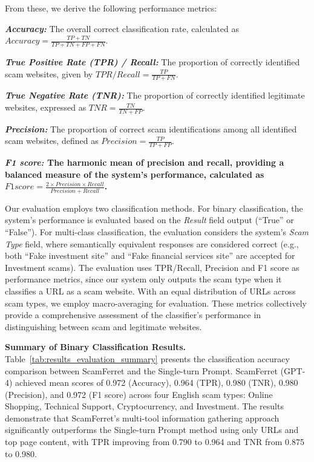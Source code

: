 \documentclass[runningheads]{llncs}
\begin{document}
From these, we derive the following performance metrics:

\noindent\textbf{\textit{Accuracy:}}
The overall correct classification rate, calculated as $Accuracy = \frac{TP + TN}{TP + TN + FP + FN}$.

\noindent\textbf{\textit{True Positive Rate (TPR) / Recall:}}
The proportion of correctly identified scam websites, given by 
$TPR/Recall = \frac{TP}{TP + FN}$.

\noindent\textbf{\textit{True Negative Rate (TNR):}}
The proportion of correctly identified legitimate websites, expressed as $TNR = \frac{TN}{TN + FP}$.

\noindent\textbf{\textit{Precision:}}
The proportion of correct scam identifications among all identified scam websites, defined as $Precision = \frac{TP}{TP + FP}$.

\noindent\textbf{\textit{F1 score:}
The harmonic mean of precision and recall, providing a balanced measure of the system's performance, calculated as $F1 score = \frac{2 \times Precision \times Recall}{Precision + Recall}$.}

Our evaluation employs two classification methods.
For binary classification, the system's performance is evaluated based on the \textit{Result} field output (``True'' or ``False'').
For multi-class classification, the evaluation considers the system's \textit{Scam Type} field, where semantically equivalent responses are considered correct (e.g., both ``Fake investment site'' and ``Fake financial services site'' are accepted for Investment scams).
The evaluation uses TPR/Recall, Precision and F1 score as performance metrics, since our system only outputs the scam type when it classifies a URL as a scam website.
With an equal distribution of URLs across scam types, we employ macro-averaging for evaluation.
These metrics collectively provide a comprehensive assessment of the classifier's performance in distinguishing between scam and legitimate websites.




\noindent\textbf{Summary of Binary Classification Results.}
Table~\ref{tab:results_evaluation_summary} presents the classification accuracy comparison between ScamFerret and the Single-turn Prompt.
ScamFerret (GPT-4) achieved mean scores of 0.972 (Accuracy), 0.964 (TPR), 0.980 (TNR), 0.980 (Precision), and 0.972 (F1 score) across four English scam types: Online Shopping, Technical Support, Cryptocurrency, and Investment.
The results demonstrate that ScamFerret's multi-tool information gathering approach significantly outperforms the Single-turn Prompt method using only URLs and top page content, with TPR improving from 0.790 to 0.964 and TNR from 0.875 to 0.980.
\end{document}
